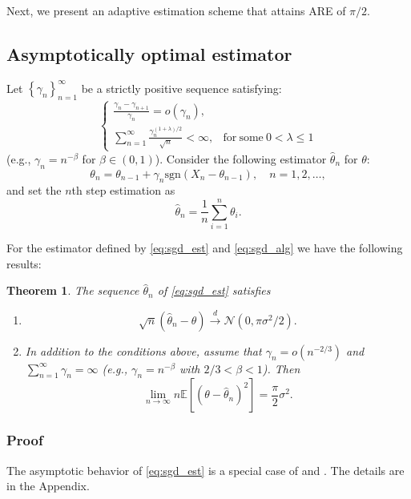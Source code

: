 \documentclass[letterpaper, conference,9pt]{IEEEtran}      %
\newtheorem{thm}{\bf{Theorem}}
\newcommand{\sgn}{\mathrm{sgn} }
\begin{document}
Next, we present an adaptive estimation scheme that attains ARE of $\pi/2$. 
\subsection{Asymptotically optimal estimator}
Let $\left\{\gamma_n \right\}_{n=1}^\infty$ be a strictly positive sequence satisfying:
\begin{equation} \label{eq:conditions}
\begin{cases}
\frac{\gamma_n - \gamma_{n+1}}{\gamma_n} = o(\gamma_n), &  \\
\sum_{n=1}^\infty \frac{\gamma_n^{(1+\lambda)/2}} {\sqrt{n}} < \infty, & 
\mathrm{for~some~}0< \lambda \leq 1
\end{cases}
\end{equation}
(e.g., $\gamma_n = n^{-\beta}$ for $\beta \in (0,1)$). Consider the following estimator $\widehat{\theta}_n$ for $\theta$:  
\begin{equation}
\label{eq:sgd_alg}
\theta_n = \theta_{n-1} +  \gamma_n \sgn (X_n - \theta_{n-1}), \quad n = 1,2,\ldots,
\end{equation}
and set the $n$th step estimation as
\begin{equation} \label{eq:sgd_est}
\widehat{\theta}_n =  \frac{1}{n} \sum_{i=1}^n  \theta_i. 
\end{equation}

For the estimator defined by \eqref{eq:sgd_est} and \eqref{eq:sgd_alg} we have the following results:
\begin{thm} \label{thm:sgd}
The sequence $\widehat{\theta}_n$ of \eqref{eq:sgd_est} satisfies
\begin{enumerate}
\item[(i)]
\[
\sqrt{n} \left( \widehat{\theta}_n - \theta \right) \overset{d}{\rightarrow} \mathcal N \left(0,  \pi \sigma^2 /2 \right).
\]
\item[(ii)] In addition to the conditions above, assume that $\gamma_n = o(n^{-2/3})$ and $\sum_{n=1}^\infty \gamma_n = \infty$ (e.g., $\gamma_n = n^{-\beta}$ with $2/3<\beta<1$). Then
\[
\lim_{n\rightarrow \infty} n\mathbb E \left[ \left(\theta-\widehat{\theta}_n \right)^2 \right] = \frac{\pi}{2} \sigma^2 . 
\]
\end{enumerate}

\end{thm}

\subsubsection*{Proof}
The asymptotic behavior of \eqref{eq:sgd_est} is a special case of \cite[Thm. 4]{polyak1992acceleration} and \cite[Thm. 2]{polyak1990new}. The details are in the Appendix.\\
\end{document}
